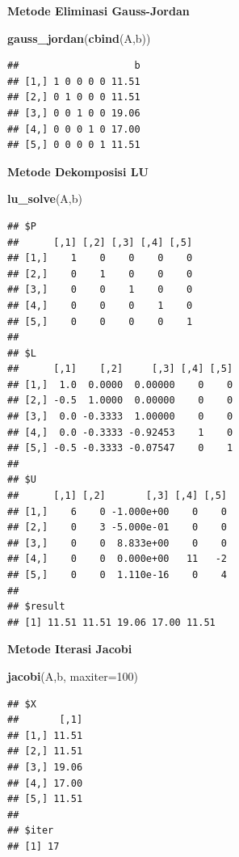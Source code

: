 \documentclass[
]{book}
\newenvironment{Shaded}{\begin{snugshade}}{\end{snugshade}}
\newcommand{\AttributeTok}[1]{\textcolor[rgb]{0.13,0.29,0.53}{#1}}
\newcommand{\DecValTok}[1]{\textcolor[rgb]{0.00,0.00,0.81}{#1}}
\newcommand{\FunctionTok}[1]{\textcolor[rgb]{0.13,0.29,0.53}{\textbf{#1}}}
\newcommand{\NormalTok}[1]{#1}
\theoremstyle{definition}
\theoremstyle{definition}
\theoremstyle{definition}
\theoremstyle{definition}
\theoremstyle{remark}
\begin{document}
\textbf{Metode Eliminasi Gauss-Jordan}

\begin{Shaded}
\begin{Highlighting}[]
\FunctionTok{gauss\_jordan}\NormalTok{(}\FunctionTok{cbind}\NormalTok{(A,b))}
\end{Highlighting}
\end{Shaded}

\begin{verbatim}
##                    b
## [1,] 1 0 0 0 0 11.51
## [2,] 0 1 0 0 0 11.51
## [3,] 0 0 1 0 0 19.06
## [4,] 0 0 0 1 0 17.00
## [5,] 0 0 0 0 1 11.51
\end{verbatim}

\textbf{Metode Dekomposisi LU}

\begin{Shaded}
\begin{Highlighting}[]
\FunctionTok{lu\_solve}\NormalTok{(A,b)}
\end{Highlighting}
\end{Shaded}

\begin{verbatim}
## $P
##      [,1] [,2] [,3] [,4] [,5]
## [1,]    1    0    0    0    0
## [2,]    0    1    0    0    0
## [3,]    0    0    1    0    0
## [4,]    0    0    0    1    0
## [5,]    0    0    0    0    1
## 
## $L
##      [,1]    [,2]     [,3] [,4] [,5]
## [1,]  1.0  0.0000  0.00000    0    0
## [2,] -0.5  1.0000  0.00000    0    0
## [3,]  0.0 -0.3333  1.00000    0    0
## [4,]  0.0 -0.3333 -0.92453    1    0
## [5,] -0.5 -0.3333 -0.07547    0    1
## 
## $U
##      [,1] [,2]       [,3] [,4] [,5]
## [1,]    6    0 -1.000e+00    0    0
## [2,]    0    3 -5.000e-01    0    0
## [3,]    0    0  8.833e+00    0    0
## [4,]    0    0  0.000e+00   11   -2
## [5,]    0    0  1.110e-16    0    4
## 
## $result
## [1] 11.51 11.51 19.06 17.00 11.51
\end{verbatim}

\textbf{Metode Iterasi Jacobi}

\begin{Shaded}
\begin{Highlighting}[]
\FunctionTok{jacobi}\NormalTok{(A,b, }\AttributeTok{maxiter=}\DecValTok{100}\NormalTok{)}
\end{Highlighting}
\end{Shaded}

\begin{verbatim}
## $X
##       [,1]
## [1,] 11.51
## [2,] 11.51
## [3,] 19.06
## [4,] 17.00
## [5,] 11.51
## 
## $iter
## [1] 17
\end{verbatim}
\end{document}
